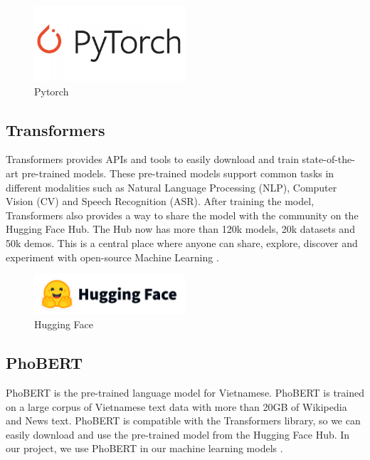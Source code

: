 \begin{figure}[ht]
    \centering
    \includegraphics[width=0.5\textwidth]{../Images/8.Technology_Stack/pytorch_logo.png}
    \caption{Pytorch}
    \label{fig:pytorch}
\end{figure}

\subsection{Transformers}
Transformers provides APIs and tools to easily download and train state-of-the-art pre-trained models. These pre-trained models support common tasks in different modalities such as Natural Language Processing (NLP), Computer Vision (CV) and Speech Recognition (ASR). After training the model, Transformers also provides a way to share the model with the community on the Hugging Face Hub. The Hub now has more than 120k models, 20k datasets and 50k demos. This is a central place where anyone can share, explore, discover and experiment with open-source Machine Learning \cite{huggingface}.

\begin{figure}[ht]
    \centering
    \includegraphics[width=0.5\textwidth]{../Images/8.Technology_Stack/huggingface_logo.png}
    \caption{Hugging Face}
    \label{fig:huggingface}
\end{figure}

\subsection{PhoBERT}
PhoBERT is the pre-trained language model for Vietnamese. PhoBERT is trained on a large corpus of Vietnamese text data with more than 20GB of Wikipedia and News text. PhoBERT is compatible with the Transformers library, so we can easily download and use the pre-trained model from the Hugging Face Hub. In our project, we use PhoBERT in our machine learning models \cite{phobert}.

